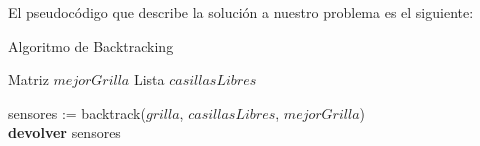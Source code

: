 El pseudocódigo que describe la solución a nuestro problema es el siguiente:

\begin{algorithm}[H]
	\SetAlgoLined
	\caption{Algoritmo de Backtracking}
	
	Matriz $mejorGrilla$
	Lista $casillasLibres$\\


	sensores := backtrack($grilla$, $casillasLibres$, $mejorGrilla$)\\

	\textbf{devolver} sensores
\end{algorithm}


